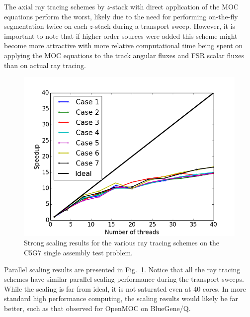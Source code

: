 The axial ray tracing schemes by $z$-stack with direct application of the MOC equations perform the worst, likely due to the need for performing on-the-fly segmentation twice on each $z$-stack during a transport sweep. However, it is important to note that if higher order sources were added this scheme might become more attractive with more relative computational time being spent on applying the MOC equations to the track angular fluxes and FSR scalar fluxes than on actual ray tracing.

\begin{figure}[ht!]
	\centering
	\includegraphics[width=0.75\linewidth]{figures/ph2016/scaling.png}
	\caption{Strong scaling results for the various ray tracing schemes on the C5G7 single assembly test problem.}
	\label{fig::scaling}
\end{figure}

Parallel scaling results are presented in Fig.~\ref{fig::scaling}. Notice that all the ray tracing schemes have similar parallel scaling performance during the transport sweeps. While the scaling is far from ideal, it is not saturated even at 40 cores. In more standard high performance computing, the scaling results would likely be far better, such as that observed for OpenMOC on BlueGene/Q\cite{will}.






